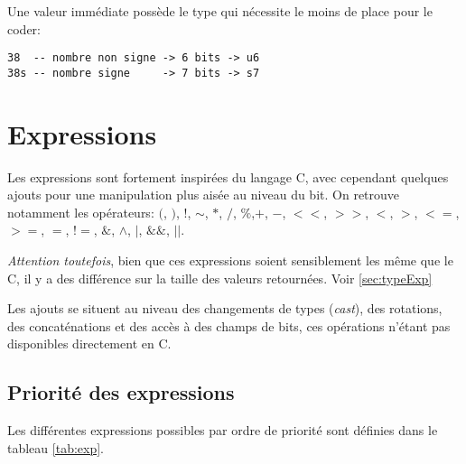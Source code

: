 Une valeur immédiate possède le type qui nécessite le moins de place pour le coder:
\begin{lstlisting}
38  -- nombre non signe -> 6 bits -> u6
38s -- nombre signe     -> 7 bits -> s7
\end{lstlisting}


\section{Expressions}
\label{sec:expressions}

Les expressions sont fortement inspirées du langage C, avec cependant quelques ajouts pour une manipulation plus aisée au niveau du bit. On retrouve notamment les opérateurs: $($, $)$, $!$, $\sim$, $*$, $/$, $\%$,$+$, $-$, $<<$, $>>$, $<$, $>$, $<=$, $>=$, $=$, $!=$, $\&$, $\wedge$, $|$, $\&\&$, $||$.

\emph{Attention toutefois}, bien que ces expressions soient sensiblement les même que le C, il y a des différence sur la taille des valeurs retournées. Voir \ref{sec:typeExp}

Les ajouts se situent au niveau des changements de types (\emph{cast}), des rotations, des concaténations et des accès à des champs de bits, ces opérations n'étant pas disponibles directement en C.

\subsection{Priorité des expressions}
Les différentes expressions possibles par ordre de priorité sont définies dans le tableau \ref{tab:exp}.

